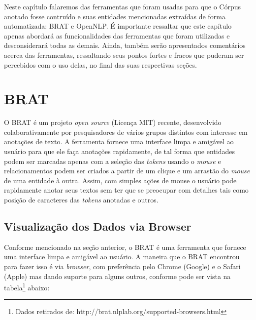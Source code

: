 \documentclass[11pt]{report}
\begin{document}
\indent\indent Neste capítulo falaremos das ferramentas que foram usadas para que o Córpus anotado fosse contruído e suas entidades mencionadas extraídas
de forma automatizada: BRAT e OpenNLP. É importante ressaltar que este capítulo apenas abordará as funcionalidades das ferramentas que foram utilizadas e desconsiderará todas as
demais. Ainda, também serão apresentados comentários acerca das ferramentas, ressaltando seus pontos fortes e fracos que puderam ser percebidos com o uso delas,
no final das suas respectivas seções.

\section{BRAT}

\indent\indent O BRAT é um projeto \textit{open source} (Licença MIT) recente, desenvolvido colaborativamente por pesquisadores de vários grupos distintos com interesse em
anotações de texto. A ferramenta fornece uma interface limpa e amigável ao usuário para que ele faça anotações rapidamente, de tal forma que
entidades podem ser marcadas apenas com a seleção das \textit{tokens} usando o \textit{mouse} e relacionamentos podem ser criados a partir de um clique e um arrastão do
\textit{mouse} de uma entidade à outra. Assim, com simples ações de mouse o usuário pode rapidamente anotar seus textos sem ter que se preocupar com detalhes tais como
posição de caracteres das \textit{tokens} anotadas e outros.

\subsection{Visualização dos Dados via Browser}

\indent\indent Conforme mencionado na seção anterior, o BRAT é uma ferramenta que fornece uma interface limpa e amigável ao usuário. A maneira que o BRAT encontrou para fazer isso
é via \textit{browser}, com preferência pelo Chrome (Google) e o Safari (Apple) mas dando suporte para alguns outros, conforme pode ser vista na
tabela\footnote[9]{Dados retirados de: http://brat.nlplab.org/supported-browsers.html} abaixo:
\end{document}
